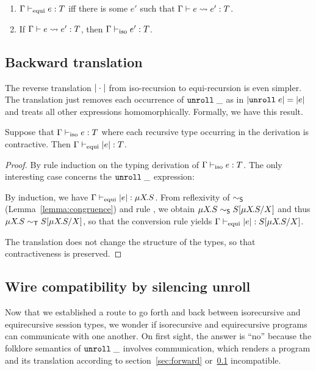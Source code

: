 \begin{lemma}
  \begin{enumerate}
  \item $\typing{\tyEqui e} T$ iff there is some $e'$ such that
    $\translation e {e'} T$.
  \item If $\translation e {e'} T$, then $\typing{\tyIso e'} T$.
  \end{enumerate}
\end{lemma}

\subsection{Backward translation}
\label{sec:backward-translation}

The reverse translation $\IsoToEqui\cdot$ from iso-recursion to equi-recursion is even
simpler. The translation just removes each occurrence of $\EUnroll\_$
as in $\IsoToEqui{\EUnroll e} = \IsoToEqui e$ and treats all other
expressions homomorphically. Formally, we have this result.
\begin{lemma}
  Suppose that $\typing{\tyIso e}T$ where each recursive type
  occurring in the derivation is contractive.
  Then $\typing{\tyEqui \IsoToEqui{e}}T$.
\end{lemma}
\begin{proof}
  By rule induction on the typing derivation of  $\typing{\tyIso
    e}T$. The only interesting case concerns the $\EUnroll\_$
  expression:
  \begin{mathpar}
  \end{mathpar}
  By induction, we have $\typing{\tyEqui \IsoToEqui{e}}{\TRec S}$.
  From reflexivity of $\eqs$ (Lemma~\ref{lemma:congruence}) and rule
  {\EqUnrollL}, we obtain $\TRec S 
  \eqs S[\TRec[X\!] S / X]$ and thus  $\TRec S 
  \eqt S[\TRec[X\!] S / X]$, so that the conversion rule yields
  $\typing{\tyEqui \IsoToEqui{e}}{S[\TRec[X\!] S / X]}$.

  The translation does not change the structure of the types, so that
  contractiveness is preserved.
\end{proof}

\subsection{Wire compatibility by silencing unroll}
\label{sec:wire-compatibility}

Now that we established a route to go forth and back between
isorecursive and equirecursive session types, we wonder if
isorecursive and equirecursive programs can communicate with one
another. On first sight, the answer is ``no'' because the folklore
semantics of $\EUnroll\_$ involves communication, which renders a
program and its translation according to section~\ref{sec:forward}
or~\ref{sec:backward-translation} incompatible.

